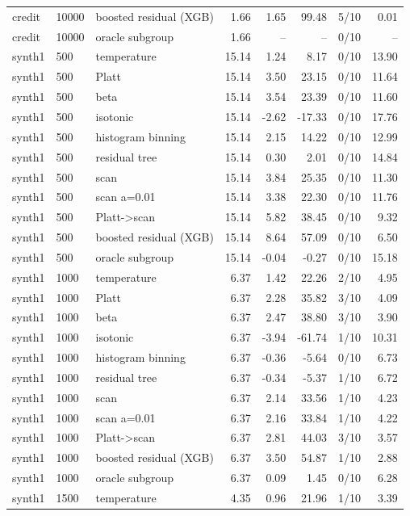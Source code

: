 \begin{tabular}{lllrrrlr}
credit & 10000 & boosted residual (XGB) & 1.66 & 1.65 & 99.48 & 5/10 & 0.01 \\
credit & 10000 & oracle subgroup & 1.66 & -- & -- & 0/10 & -- \\
synth1 & 500 & temperature & 15.14 & 1.24 & 8.17 & 0/10 & 13.90 \\
synth1 & 500 & Platt & 15.14 & 3.50 & 23.15 & 0/10 & 11.64 \\
synth1 & 500 & beta & 15.14 & 3.54 & 23.39 & 0/10 & 11.60 \\
synth1 & 500 & isotonic & 15.14 & -2.62 & -17.33 & 0/10 & 17.76 \\
synth1 & 500 & histogram binning & 15.14 & 2.15 & 14.22 & 0/10 & 12.99 \\
synth1 & 500 & residual tree & 15.14 & 0.30 & 2.01 & 0/10 & 14.84 \\
synth1 & 500 & scan & 15.14 & 3.84 & 25.35 & 0/10 & 11.30 \\
synth1 & 500 & scan a=0.01 & 15.14 & 3.38 & 22.30 & 0/10 & 11.76 \\
synth1 & 500 & Platt->scan & 15.14 & 5.82 & 38.45 & 0/10 & 9.32 \\
synth1 & 500 & boosted residual (XGB) & 15.14 & 8.64 & 57.09 & 0/10 & 6.50 \\
synth1 & 500 & oracle subgroup & 15.14 & -0.04 & -0.27 & 0/10 & 15.18 \\
synth1 & 1000 & temperature & 6.37 & 1.42 & 22.26 & 2/10 & 4.95 \\
synth1 & 1000 & Platt & 6.37 & 2.28 & 35.82 & 3/10 & 4.09 \\
synth1 & 1000 & beta & 6.37 & 2.47 & 38.80 & 3/10 & 3.90 \\
synth1 & 1000 & isotonic & 6.37 & -3.94 & -61.74 & 1/10 & 10.31 \\
synth1 & 1000 & histogram binning & 6.37 & -0.36 & -5.64 & 0/10 & 6.73 \\
synth1 & 1000 & residual tree & 6.37 & -0.34 & -5.37 & 1/10 & 6.72 \\
synth1 & 1000 & scan & 6.37 & 2.14 & 33.56 & 1/10 & 4.23 \\
synth1 & 1000 & scan a=0.01 & 6.37 & 2.16 & 33.84 & 1/10 & 4.22 \\
synth1 & 1000 & Platt->scan & 6.37 & 2.81 & 44.03 & 3/10 & 3.57 \\
synth1 & 1000 & boosted residual (XGB) & 6.37 & 3.50 & 54.87 & 1/10 & 2.88 \\
synth1 & 1000 & oracle subgroup & 6.37 & 0.09 & 1.45 & 0/10 & 6.28 \\
synth1 & 1500 & temperature & 4.35 & 0.96 & 21.96 & 1/10 & 3.39 \\

\end{tabular}
